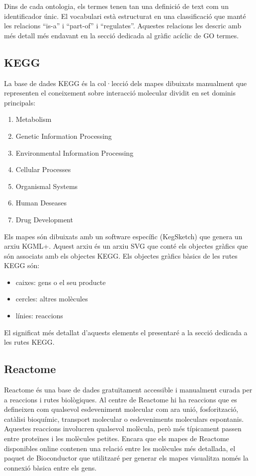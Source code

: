 Dins de cada ontologia, els termes tenen tan una definició de text com un identificador únic. El vocabulari està estructurat en una classificació que manté les relacions ``is-a'' i ``part-of'' i ``regulates''. Aquestes relacions les descric amb més detall més endavant en la secció dedicada al gràfic acíclic de \gls{GO} termes.

\subsection{\gls{KEGG}}
La base de dades \gls{KEGG} és la col·lecció dels mapes dibuixats manualment que representen el coneixement sobre interacció molecular dividit en set dominis principals:
\begin{enumerate}
\item Metabolism
\item Genetic Information Processing
\item Environmental Information Processing
\item Cellular Processes
\item Organismal Systems
\item Human Deseases
\item Drug Development
\end{enumerate}

Els mapes són dibuixats amb un software específic (KegSketch) que genera un arxiu KGML+. Aquest arxiu és un arxiu SVG que conté els objectes gràfics que són associats amb els objectes \gls{KEGG}. Els objectes gràfics bàsics de les rutes \gls{KEGG} són:
\begin{itemize}
\item caixes: gens o el seu producte
\item cercles: altres molècules
\item línies: reaccions
\end{itemize}
El significat més detallat d'aquests elements el presentaré a la secció dedicada a les rutes \gls{KEGG}.

\subsection{Reactome}

Reactome és una base de dades gratuïtament accessible i manualment curada per a reaccions i rutes biològiques. Al centre de Reactome hi ha reaccions que es defineixen com qualsevol esdeveniment molecular com ara unió, fosforització, catàlisi bioquímic, transport molecular o esdeveniments moleculars espontanis. Aquestes reaccions involucren qualsevol molècula, però més típicament passen entre proteïnes i les molècules petites. Encara que els mapes de Reactome disponibles online contenen una relació entre les molècules més detallada, el paquet de \gls{Bioconductor} que utilitzaré per generar els mapes visualitza només la connexió bàsica entre els gens. 

